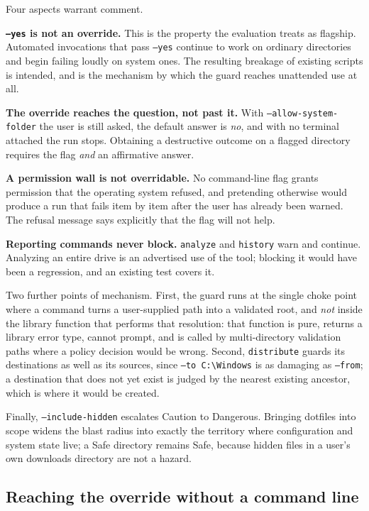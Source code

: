 \documentclass[11pt,a4paper]{article}
\newcommand{\code}[1]{\texttt{\small #1}}
\begin{document}
Four aspects warrant comment.

\textbf{\code{--yes} is not an override.} This is the property the evaluation treats
as flagship. Automated invocations that pass \code{--yes} continue to work on ordinary
directories and begin failing loudly on system ones. The resulting breakage of
existing scripts is intended, and is the mechanism by which the guard reaches
unattended use at all.

\textbf{The override reaches the question, not past it.} With
\code{--allow-system-folder} the user is still asked, the default answer is
\emph{no}, and with no terminal attached the run stops. Obtaining a destructive
outcome on a flagged directory requires the flag \emph{and} an affirmative answer.

\textbf{A permission wall is not overridable.} No command-line flag grants permission
that the operating system refused, and pretending otherwise would produce a run that
fails item by item after the user has already been warned. The refusal message says
explicitly that the flag will not help.

\textbf{Reporting commands never block.} \code{analyze} and \code{history} warn and
continue. Analyzing an entire drive is an advertised use of the tool; blocking it
would have been a regression, and an existing test covers it.

Two further points of mechanism. First, the guard runs at the single choke point where
a command turns a user-supplied path into a validated root, and \emph{not} inside the
library function that performs that resolution: that function is pure, returns a
library error type, cannot prompt, and is called by multi-directory validation paths
where a policy decision would be wrong. Second, \code{distribute} guards its
destinations as well as its sources, since \code{--to C:\textbackslash Windows} is as damaging as
\code{--from}; a destination that does not yet exist is judged by the nearest existing
ancestor, which is where it would be created.

Finally, \code{--include-hidden} escalates \textsf{Caution} to \textsf{Dangerous}.
Bringing dotfiles into scope widens the blast radius into exactly the territory where
configuration and system state live; a \textsf{Safe} directory remains \textsf{Safe},
because hidden files in a user's own downloads directory are not a hazard.

\subsection{Reaching the override without a command line}
\label{sec:detect:menu}
\end{document}
